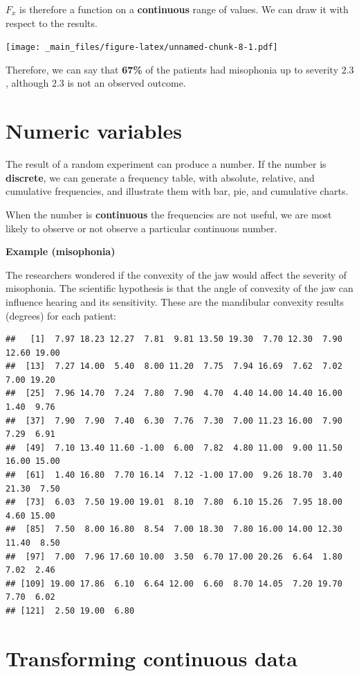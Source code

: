 \documentclass[
]{book}
\begin{document}
\(F_x\) is therefore a function on a \textbf{continuous} range of values. We can draw it with respect to the results.

\texttt{[image: \_main\_files/figure-latex/unnamed-chunk-8-1.pdf]}

Therefore, we can say that \textbf{67\%} of the patients had misophonia up to severity \(2.3\), although \(2.3\) is not an observed outcome.

\hypertarget{numeric-variables}{%
\section{Numeric variables}\label{numeric-variables}}

The result of a random experiment can produce a number. If the number is \textbf{discrete}, we can generate a frequency table, with absolute, relative, and cumulative frequencies, and illustrate them with bar, pie, and cumulative charts.

When the number is \textbf{continuous} the frequencies are not useful, we are most likely to observe or not observe a particular continuous number.

\textbf{Example (misophonia)}

The researchers wondered if the convexity of the jaw would affect the severity of misophonia. The scientific hypothesis is that the angle of convexity of the jaw can influence hearing and its sensitivity. These are the mandibular convexity results (degrees) for each patient:

\begin{verbatim}
##   [1]  7.97 18.23 12.27  7.81  9.81 13.50 19.30  7.70 12.30  7.90 12.60 19.00
##  [13]  7.27 14.00  5.40  8.00 11.20  7.75  7.94 16.69  7.62  7.02  7.00 19.20
##  [25]  7.96 14.70  7.24  7.80  7.90  4.70  4.40 14.00 14.40 16.00  1.40  9.76
##  [37]  7.90  7.90  7.40  6.30  7.76  7.30  7.00 11.23 16.00  7.90  7.29  6.91
##  [49]  7.10 13.40 11.60 -1.00  6.00  7.82  4.80 11.00  9.00 11.50 16.00 15.00
##  [61]  1.40 16.80  7.70 16.14  7.12 -1.00 17.00  9.26 18.70  3.40 21.30  7.50
##  [73]  6.03  7.50 19.00 19.01  8.10  7.80  6.10 15.26  7.95 18.00  4.60 15.00
##  [85]  7.50  8.00 16.80  8.54  7.00 18.30  7.80 16.00 14.00 12.30 11.40  8.50
##  [97]  7.00  7.96 17.60 10.00  3.50  6.70 17.00 20.26  6.64  1.80  7.02  2.46
## [109] 19.00 17.86  6.10  6.64 12.00  6.60  8.70 14.05  7.20 19.70  7.70  6.02
## [121]  2.50 19.00  6.80
\end{verbatim}

\hypertarget{transforming-continuous-data}{%
\section{Transforming continuous data}\label{transforming-continuous-data}}
\end{document}
